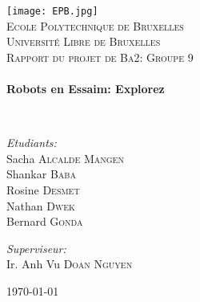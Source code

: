 \begin{titlepage}
\begin{center}

\texttt{[image: EPB.jpg]}~\\[1cm]

\textsc{\LARGE Ecole Polytechnique de Bruxelles\\Université Libre de Bruxelles}\\[1.5cm]

\textsc{\Large Rapport du projet de Ba2: Groupe 9}\\[0.5cm]

\HRule \\[0.4cm]
{ \huge \bfseries Robots en Essaim: Explorez\\[0.4cm] }

\HRule \\[1.5cm]

\begin{minipage}{0.4\textwidth}
\begin{flushleft} \large
\emph{Etudiants:}\\
Sacha \textsc{Alcalde Mangen}\\
Shankar \textsc{Baba}\\
Rosine \textsc{Desmet}\\
Nathan \textsc{Dwek}\\
Bernard \textsc{Gonda}\\
\end{flushleft}
\end{minipage}
\begin{minipage}{0.4\textwidth}
\begin{flushright} \large
\emph{Superviseur:} \\
Ir. Anh Vu \textsc{Doan Nguyen}
\end{flushright}
\end{minipage}

\vfill

{\large \today}

\end{center}
\end{titlepage}